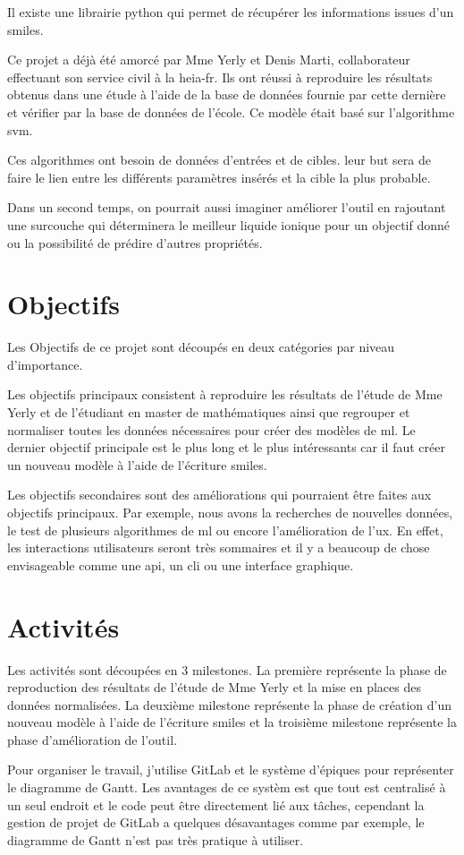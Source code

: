  
Il existe une librairie python qui permet de récupérer les informations issues d'un \acrshort{smiles}.

Ce projet a déjà été amorcé par Mme Yerly et Denis Marti, collaborateur effectuant son service civil à la \acrshort{heia-fr}.
Ils ont réussi à reproduire les résultats obtenus dans une étude\cite{WANG2021432} à l'aide de la base de données fournie par cette dernière et vérifier par la base de données de l'école.
Ce modèle était basé sur l'algorithme \acrfull{svm}.

Ces algorithmes ont besoin de données d'entrées et de cibles.
leur but sera de faire le lien entre les différents paramètres insérés et la cible la plus probable.

Dans un second temps, on pourrait aussi imaginer améliorer l'outil en rajoutant une surcouche qui déterminera le meilleur liquide ionique pour un objectif donné ou la possibilité de prédire d'autres propriétés.


\section{Objectifs}

Les Objectifs de ce projet sont découpés en deux catégories par niveau d'importance.


Les objectifs principaux consistent à reproduire les résultats de l'étude de Mme Yerly et de l'étudiant en master de mathématiques ainsi que regrouper et normaliser toutes les données nécessaires pour créer des modèles de \acrlong{ml}.
Le dernier objectif principale est le plus long et le plus intéressants car il faut créer un nouveau modèle à l'aide de l'écriture \acrshort{smiles}.


Les objectifs secondaires sont des améliorations qui pourraient être faites aux objectifs principaux.
Par exemple, nous avons la recherches de nouvelles données, le test de plusieurs algorithmes de \acrlong{ml} ou encore l'amélioration de l'\acrlong{ux}.
En effet, les interactions utilisateurs seront très sommaires et il y a beaucoup de chose envisageable comme une \acrshort{api}, un \acrshort{cli} ou une interface graphique.


\section{Activités}

Les activités sont découpées en 3 milestones. La première représente la phase de reproduction des résultats de l'étude de Mme Yerly et la mise en places des données normalisées.
La deuxième milestone représente la phase de création d'un nouveau modèle à l'aide de l'écriture \acrshort{smiles} et la troisième milestone représente la phase d'amélioration de l'outil.

Pour organiser le travail, j'utilise GitLab et le système d'épiques pour représenter le diagramme de Gantt.
Les avantages de ce systèm est que tout est centralisé à un seul endroit et le code peut être directement lié aux tâches, cependant la gestion de projet de GitLab a quelques désavantages comme par exemple, le diagramme de Gantt n'est pas très pratique à utiliser.

